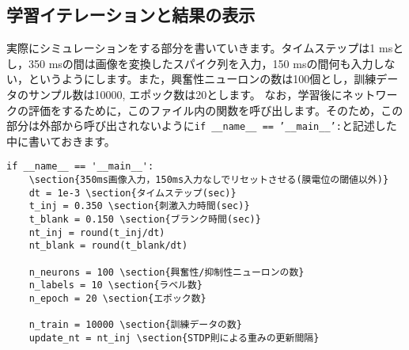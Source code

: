 \subsection{学習イテレーションと結果の表示}
実際にシミュレーションをする部分を書いていきます。タイムステップは1 msとし，350 msの間は画像を変換したスパイク列を入力，150 msの間何も入力しない，というようにします。また，興奮性ニューロンの数は100個とし，訓練データのサンプル数は10000, エポック数は20とします。
なお，学習後にネットワークの評価をするために，このファイル内の関数を呼び出します。そのため，この部分は外部から呼び出されないように\texttt{if \_\_name\_\_ == '\_\_main\_\_':}と記述した中に書いておきます。
\begin{verbatim}
if __name__ == '__main__':
    \section{350ms画像入力，150ms入力なしでリセットさせる(膜電位の閾値以外)}
    dt = 1e-3 \section{タイムステップ(sec)}
    t_inj = 0.350 \section{刺激入力時間(sec)}
    t_blank = 0.150 \section{ブランク時間(sec)}
    nt_inj = round(t_inj/dt)
    nt_blank = round(t_blank/dt)
    
    n_neurons = 100 \section{興奮性/抑制性ニューロンの数}
    n_labels = 10 \section{ラベル数}
    n_epoch = 20 \section{エポック数}
    
    n_train = 10000 \section{訓練データの数}
    update_nt = nt_inj \section{STDP則による重みの更新間隔}
    

\end{verbatim}
